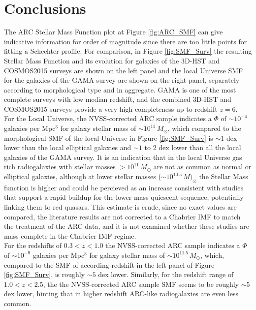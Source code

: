 \chapter{Conclusions} \label{chp:conclusion}
The ARC Stellar Mass Function plot at Figure \ref{fig:ARC_SMF} can give indicative information for order of magnitude since there are too little points for fitting a Schechter profile. For comparison, in Figure \ref{fig:SMF_Surv} the resulting Stellar Mass Function and its evolution for galaxies of the 3D-HST\cite{3DHST2012}\cite{3DHST2016} and COSMOS2015\cite{COSMOS152016} surveys are shown on the left panel\cite{Leja2020} and the local Universe SMF for the galaxies of the GAMA\cite{GAMA2009} survey are shown on the right panel\cite{Driver2022}, separately according to morphological type and in aggregate. GAMA is one of the most complete surveys with low median redshift, and the combined 3D-HST and COSMOS2015 surveys provide a very high completeness up to redshift $z=6$. \\
For the Local Universe, the NVSS-corrected ARC sample indicates a $\Phi$ of $\sim 10^{-4}$ galaxies per Mpc$^3$ for galaxy stellar mass of $\sim 10^{11} \,M_\odot$, which compared to the morphological SMF of the local Universe in Figure \ref{fig:SMF_Surv} is $\sim 1 $ dex lower than the local elliptical galaxies and $\sim 1$ to $2$ dex lower than all the local galaxies of the GAMA survey. It is an indication that in the local Universe gas rich radiogalaxies with stellar masses $> 10^{11}\,M_\odot$ are not as common as normal or elliptical galaxies, although at lower stellar masses ($\sim 10^{10.5}\, M)_\odot$ the Stellar Mass function is higher and could be percieved as an increase consistent with studies\cite{Tomczak2014} that support a rapid buildup for the lower mass quiescent sequence, potentially linking them to red quasars. This estimate is crude, since no exact values are compared, the literature results are not corrected to a Chabrier IMF to match the treatment of the ARC data, and it is not examined whether these studies are mass complete in the Chabrier IMF regime.\\
For the redshifts of $0.3<z<1.0$ the NVSS-corrected ARC sample indicates a $\Phi$ of $\sim 10^{-9}$ galaxies per Mpc$^3$ for galaxy stellar mass of $\sim 10^{11.5} \,M_\odot$, which, compared to the SMF of according redshift in the left panel of Figure \ref{fig:SMF_Surv}, is roughly $\sim 5$ dex lower. Similarly, for the redshift range of $1.0<z<2.5$, the the NVSS-corrected ARC sample SMF seems to be roughly $\sim 5$ dex lower, hinting that in higher redshift ARC-like radiogalaxies are even less common. \\
